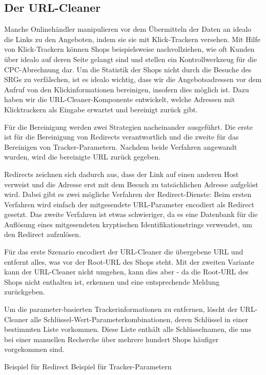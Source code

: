 \subsection{Der URL-Cleaner}
\label{subsec:urlcleaner}

Manche Onlinehändler manipulieren vor dem Übermitteln der Daten an idealo die Links zu den Angeboten, indem sie sie
mit Klick-Trackern versehen.
Mit Hilfe von Klick-Trackern können Shops beispielsweise nachvollziehen, wie oft Kunden über idealo auf deren Seite
gelangt sind und stellen ein Kontrollwerkzeug für die CPC-Abrechnung dar.
Um die Statistik der Shops nicht durch die Besuche des SRGs zu verfälschen, ist es idealo wichtig, dass wir die
Angebotsadressen vor dem Aufruf von den Klickinformationen bereinigen, insofern dies möglich ist.
Dazu haben wir die URL-Cleaner-Komponente entwickelt, welche Adressen mit Klicktrackern als Eingabe erwartet und
bereinigt zurück gibt.

Für die Bereinigung werden zwei Strategien nacheinander ausgeführt.
Die erste ist für die Bereinigung von Redirects verantwortlich und die zweite für das Bereinigen von Tracker-Parametern.
Nachdem beide Verfahren angewandt wurden, wird die bereinigte URL zurück gegeben.

Redirects zeichnen sich dadurch aus, dass der Link auf einen anderen Host verweist und die Adresse erst mit dem
Besuch zu tatsächlichen Adresse aufgelöst wird.
Dabei gibt es zwei mögliche Verfahren der Redirect-Dienste:
Beim ersten Verfahren wird einfach der mitgesendete URL-Parameter encodiert als Redirect gesetzt.
Das zweite Verfahren ist etwas schwieriger, da es eine Datenbank für die Auflösung eines mitgesendeten kryptischen
Identifikationstrings verwendet, um den Redirect aufzulösen.

Für das erste Szenario encodiert der URL-Cleaner die übergebene URL und entfernt alles, was vor der Root-URL des
Shops steht.
Mit der zweiten Variante kann der URL-Cleaner nicht umgehen, kann dies aber - da die Root-URL des Shops nicht
enthalten ist, erkennen und eine entsprechende Meldung zurückgeben.

Um die parameter-basierten Trackerinformationen zu entfernen, löscht der URL-Cleaner alle
Schlüssel-Wert-Parameterkombinationen, deren Schlüssel in einer bestimmten Liste vorkommen.
Diese Liste enthält alle Schlüsselnamen, die uns bei einer manuellen Recherche über mehrere hundert Shops häufiger
vorgekommen sind.

Beispiel für Redirect
Beispiel für Tracker-Parametern

